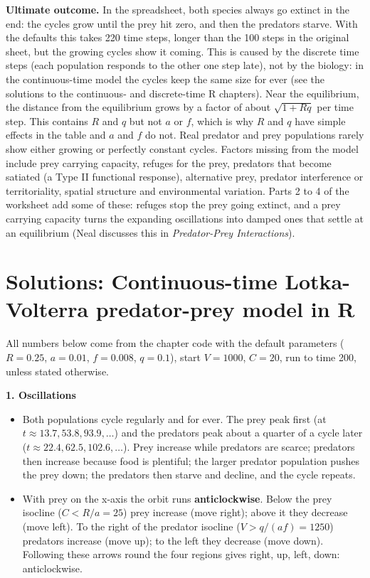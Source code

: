 \documentclass[
  a4paper]{book}
\providecommand{\tightlist}{%
  \setlength{\itemsep}{0pt}\setlength{\parskip}{0pt}}
\begin{document}
\begin{enumerate}
  \textbf{Ultimate outcome.} In the spreadsheet, both species always go extinct in the end: the cycles grow until the prey hit zero, and then the predators starve. With the defaults this takes 220 time steps, longer than the 100 steps in the original sheet, but the growing cycles show it coming. This is caused by the discrete time steps (each population responds to the other one step late), not by the biology: in the continuous-time model the cycles keep the same size for ever (see the solutions to the continuous- and discrete-time R chapters). Near the equilibrium, the distance from the equilibrium grows by a factor of about \(\sqrt{1 + Rq}\) per time step. This contains \(R\) and \(q\) but not \(a\) or \(f\), which is why \(R\) and \(q\) have simple effects in the table and \(a\) and \(f\) do not. Real predator and prey populations rarely show either growing or perfectly constant cycles. Factors missing from the model include prey carrying capacity, refuges for the prey, predators that become satiated (a Type II functional response), alternative prey, predator interference or territoriality, spatial structure and environmental variation. Parts 2 to 4 of the worksheet add some of these: refuges stop the prey going extinct, and a prey carrying capacity turns the expanding oscillations into damped ones that settle at an equilibrium (Neal discusses this in \emph{Predator-Prey Interactions}).
\end{enumerate}

\section{Solutions: Continuous-time Lotka-Volterra predator-prey model in R}\label{solutions-continuous-time-lotka-volterra-predator-prey-model-in-r}

All numbers below come from the chapter code with the default parameters (\(R = 0.25\), \(a = 0.01\), \(f = 0.008\), \(q = 0.1\)), start \(V = 1000\), \(C = 20\), run to time 200, unless stated otherwise.

\textbf{1. Oscillations}

\begin{itemize}
\tightlist
\item
  Both populations cycle regularly and for ever. The prey peak first (at \(t \approx 13.7, 53.8, 93.9, \ldots\)) and the predators peak about a quarter of a cycle later (\(t \approx 22.4, 62.5, 102.6, \ldots\)). Prey increase while predators are scarce; predators then increase because food is plentiful; the larger predator population pushes the prey down; the predators then starve and decline, and the cycle repeats.
\item
  With prey on the x-axis the orbit runs \textbf{anticlockwise}. Below the prey isocline (\(C < R/a = 25\)) prey increase (move right); above it they decrease (move left). To the right of the predator isocline (\(V > q/(af) = 1250\)) predators increase (move up); to the left they decrease (move down). Following these arrows round the four regions gives right, up, left, down: anticlockwise.
\end{itemize}
\end{document}
